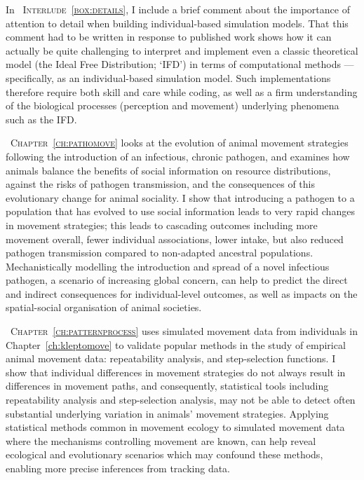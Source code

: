 \medskip

In {\scshape~Interlude~\ref{box:details}}, I include a brief comment about the importance of attention to detail when building individual-based simulation models.
That this comment had to be written in response to published work shows how it can actually be quite challenging to interpret and implement even a classic theoretical model (the Ideal Free Distribution; `IFD') in terms of computational methods --- specifically, as an individual-based simulation model.
Such implementations therefore require both skill and care while coding, as well as a firm understanding of the biological processes (perception and movement) underlying phenomena such as the IFD.

\medskip

{\scshape~Chapter~\ref{ch:pathomove}} looks at the evolution of animal movement strategies following the introduction of an infectious, chronic pathogen, and examines how animals balance the benefits of social information on resource distributions, against the risks of pathogen transmission, and the consequences of this evolutionary change for animal sociality.
I show that introducing a pathogen to a population that has evolved to use social information leads to very rapid changes in movement strategies; this leads to cascading outcomes including more movement overall, fewer individual associations, lower intake, but also reduced pathogen transmission compared to non-adapted ancestral populations.
Mechanistically modelling the introduction and spread of a novel infectious pathogen, a scenario of increasing global concern, can help to predict the direct and indirect consequences for individual-level outcomes, as well as impacts on the spatial-social organisation of animal societies.

\medskip

{\scshape~Chapter~\ref{ch:patternprocess}} uses simulated movement data from individuals in Chapter~\ref{ch:kleptomove} to validate popular methods in the study of empirical animal movement data: repeatability analysis, and step-selection functions.
I show that individual differences in movement strategies do not always result in differences in movement paths, and consequently, statistical tools including repeatability analysis and step-selection analysis, may not be able to detect often substantial underlying variation in animals' movement strategies.
Applying statistical methods common in movement ecology to simulated movement data where the mechanisms controlling movement are known, can help reveal ecological and evolutionary scenarios which may confound these methods, enabling more precise inferences from tracking data.

